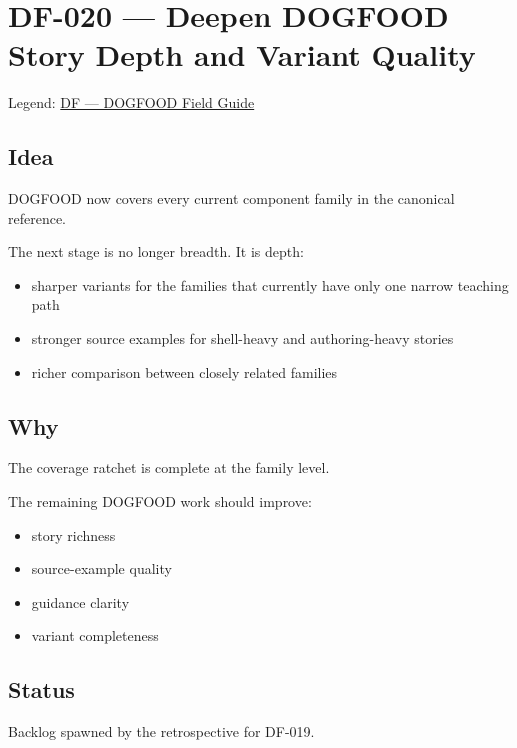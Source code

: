 \chapter{DF-020 --- Deepen DOGFOOD Story Depth and Variant Quality}\label{record-291}

\smallskip

Legend: \href{https://github.com/flyingrobots/bijou/blob/cbd70612140e7a450d764b3c7be1c6af878b99bc/docs/method/graveyard/legends/DF-dogfood-field-guide.md}{DF --- DOGFOOD Field Guide}

\section{Idea}\label{record-291-idea}

DOGFOOD now covers every current component family in the canonical reference.

The next stage is no longer breadth. It is depth:

\begin{itemize}
\tightlist
\item
  sharper variants for the families that currently have only one narrow teaching path
\item
  stronger source examples for shell-heavy and authoring-heavy stories
\item
  richer comparison between closely related families
\end{itemize}

\section{Why}\label{record-291-why}

The coverage ratchet is complete at the family level.

The remaining DOGFOOD work should improve:

\begin{itemize}
\tightlist
\item
  story richness
\item
  source-example quality
\item
  guidance clarity
\item
  variant completeness
\end{itemize}

\section{Status}\label{record-291-status}

Backlog spawned by the retrospective for DF-019.

